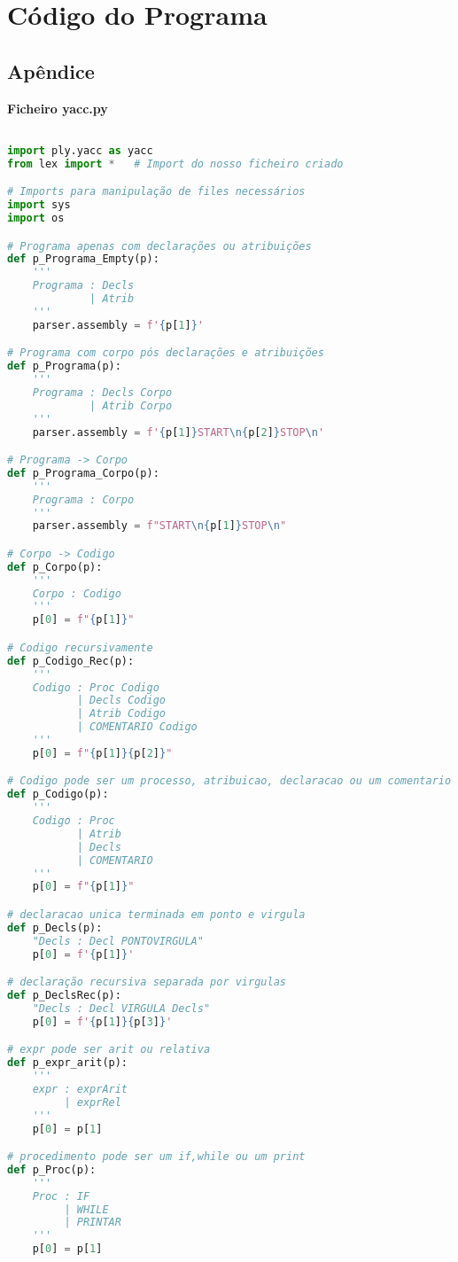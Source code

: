 \documentclass[11pt,a4paper]{report}
\begin{document}
\chapter{Código do Programa}
\section{Apêndice}
\textbf{Ficheiro yacc.py}
\begin{scriptsize} 
\begin{lstlisting}[language=python]

import ply.yacc as yacc
from lex import *   # Import do nosso ficheiro criado 

# Imports para manipulação de files necessários
import sys
import os

# Programa apenas com declarações ou atribuições
def p_Programa_Empty(p):
    '''
    Programa : Decls
             | Atrib
    '''
    parser.assembly = f'{p[1]}'

# Programa com corpo pós declarações e atribuições
def p_Programa(p):
    '''
    Programa : Decls Corpo
             | Atrib Corpo
    '''
    parser.assembly = f'{p[1]}START\n{p[2]}STOP\n'

# Programa -> Corpo
def p_Programa_Corpo(p):
    '''
    Programa : Corpo
    '''
    parser.assembly = f"START\n{p[1]}STOP\n"

# Corpo -> Codigo
def p_Corpo(p):
    '''
    Corpo : Codigo
    '''
    p[0] = f"{p[1]}"

# Codigo recursivamente
def p_Codigo_Rec(p):
    '''
    Codigo : Proc Codigo
           | Decls Codigo
           | Atrib Codigo
           | COMENTARIO Codigo
    '''
    p[0] = f"{p[1]}{p[2]}"

# Codigo pode ser um processo, atribuicao, declaracao ou um comentario
def p_Codigo(p):
    '''
    Codigo : Proc
           | Atrib
           | Decls
           | COMENTARIO
    '''
    p[0] = f"{p[1]}"

# declaracao unica terminada em ponto e virgula
def p_Decls(p):
    "Decls : Decl PONTOVIRGULA"
    p[0] = f'{p[1]}'

# declaração recursiva separada por virgulas
def p_DeclsRec(p):
    "Decls : Decl VIRGULA Decls"
    p[0] = f'{p[1]}{p[3]}'

# expr pode ser arit ou relativa
def p_expr_arit(p):
    '''
    expr : exprArit
         | exprRel
    '''
    p[0] = p[1]

# procedimento pode ser um if,while ou um print
def p_Proc(p):
    '''
    Proc : IF
         | WHILE
         | PRINTAR
    '''
    p[0] = p[1]



\end{lstlisting}
\end{scriptsize}
\end{document}
